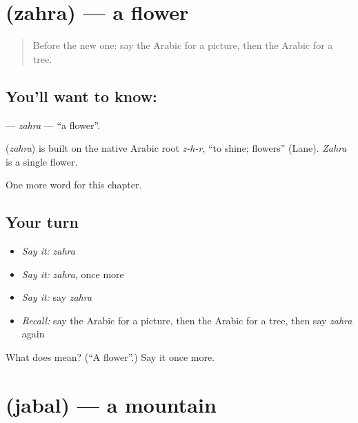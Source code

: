 \section[\texorpdfstring{\ar{زهرة} (zahra)}{زهرة (zahra)}]{ (zahra) — a flower}

\label{lesson:AR-C75-zahra}



\begin{quote}
Before the new one: say the Arabic for a picture, then the Arabic for a tree.
\end{quote}

\subsection*{You'll want to know: }
\textbf{} — \emph{zahra} — \textquotedblleft{}a flower\textquotedblright{}.

\begin{cousinweb}
\textbf{} (\emph{zahra}) is built on the native Arabic root \emph{z-h-r}, \textquotedblleft{}to shine; flowers\textquotedblright{} (Lane). \emph{Zahra} is a single flower.
\end{cousinweb}

\begin{grammarlens}[title={What you've built}]
One more word for this chapter.
\end{grammarlens}

\subsection*{Your turn}
\begin{itemize}
\raggedright
  \item \emph{Say it:} \emph{zahra}
  \item \emph{Say it:} \emph{zahra}, once more
  \item \emph{Say it:} say \emph{zahra}
  \item \emph{Recall:} say the Arabic for a picture, then the Arabic for a tree, then say \emph{zahra} again
\end{itemize}

\begin{tcolorbox}[breakable,colback=teal!4,colframe=teal!35!black,title={Before you move on}]
What does  mean? (\textquotedblleft{}A flower\textquotedblright{}.) Say it once more.
\end{tcolorbox}
\section[\texorpdfstring{\ar{جبل} (jabal)}{جبل (jabal)}]{ (jabal) — a mountain}

